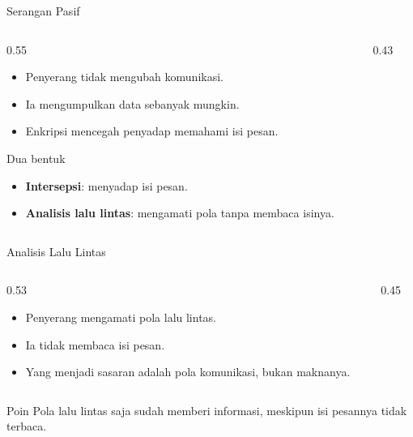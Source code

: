 \documentclass[aspectratio=169,11pt]{beamer}
\begin{document}
\begin{frame}{Serangan Pasif}
    \begin{columns}[T,onlytextwidth]
        \begin{column}{0.55\textwidth}
            \begin{itemize}
                \item Penyerang tidak mengubah komunikasi.
                \item Ia mengumpulkan data sebanyak mungkin.
                \item Enkripsi mencegah penyadap memahami isi pesan.
            \end{itemize}
            \begin{block}{Dua bentuk}
                \begin{itemize}
                    \item \textbf{Intersepsi}: menyadap isi pesan.
                    \item \textbf{Analisis lalu lintas}: mengamati pola tanpa
                          membaca isinya.
                \end{itemize}
            \end{block}
        \end{column}
        \begin{column}{0.43\textwidth}
            \centering
        \end{column}
    \end{columns}
\end{frame}

\begin{frame}{Analisis Lalu Lintas}
    \begin{columns}[T,onlytextwidth]
        \begin{column}{0.53\textwidth}
            \begin{itemize}
                \item Penyerang mengamati pola lalu lintas.
                \item Ia tidak membaca isi pesan.
                \item Yang menjadi sasaran adalah pola komunikasi, bukan
                      maknanya.
            \end{itemize}
        \end{column}
        \begin{column}{0.45\textwidth}
            \centering
        \end{column}
    \end{columns}
    \vspace{0.05cm}
    \begin{block}{Poin}
        Pola lalu lintas saja sudah memberi informasi, meskipun isi pesannya
        tidak terbaca.
    \end{block}
\end{frame}
\end{document}
